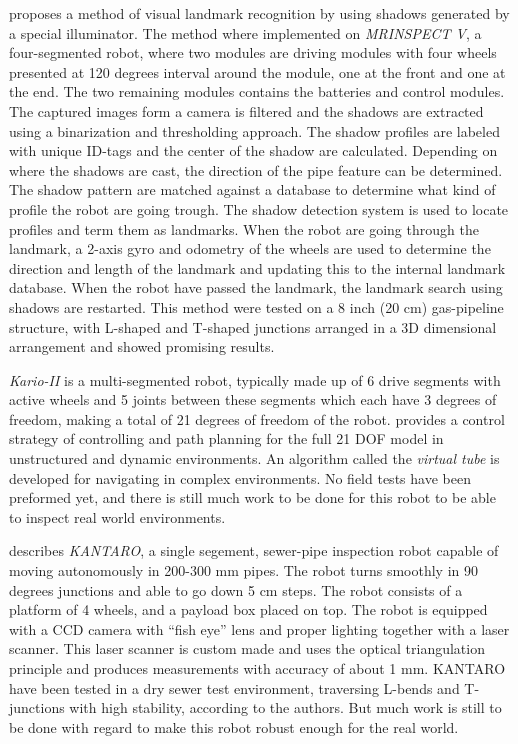 \cite{MRINSPECT-V} proposes a method of visual landmark recognition by using shadows
generated by a special illuminator. The method where implemented on \emph{MRINSPECT V}, a
four-segmented robot, where two modules are driving modules with four wheels presented at
120 degrees interval around the module, one at the front and one at the end. The two
remaining modules contains the batteries and control modules. 
The captured images form a camera is filtered and the
shadows are extracted using a binarization and thresholding approach. The shadow profiles are
labeled with unique ID-tags and the center of the shadow are calculated. Depending on
where the shadows are cast, the direction of the pipe feature can be determined. The
shadow pattern are matched against a database to determine what kind of profile the robot
are going trough. The shadow detection system is used to locate profiles and term them as
landmarks. When the robot are going through the landmark, a 2-axis gyro and odometry of
the wheels are used to determine the direction and length of the landmark and updating
this to the internal landmark database. When the robot have passed the landmark, the 
landmark search using shadows are restarted. This method were tested on a 8 inch (20 cm)
gas-pipeline structure, with L-shaped and T-shaped junctions arranged in a 3D dimensional
arrangement and showed promising results. 


\emph{Kario-II} is a multi-segmented robot, typically made up of 6 drive segments with
active wheels and 5 joints between these segments which each have 3 degrees of freedom,
making a total of 21 degrees of freedom of the robot. \cite{Kairo-II} provides a control
strategy of controlling and path planning for the full 21 DOF model in unstructured and
dynamic environments. An algorithm called the \emph{virtual tube} is developed for
navigating in complex environments. No field tests have been preformed yet, and there is
still much work to be done for this robot to be able to inspect real world environments. 


\cite{KANTARO} describes \emph{KANTARO}, a single segement, sewer-pipe inspection robot 
capable of moving autonomously in 200-300 mm pipes. The robot turns smoothly in 90 degrees 
junctions and able to go down 5 cm steps. The robot consists of a platform of 4 wheels,
and a payload box placed on top. The robot is equipped with a CCD camera with ``fish eye''
lens and proper lighting together with a laser scanner. This laser scanner is custom made
and uses the optical triangulation principle and produces measurements with accuracy
of about 1 mm. KANTARO have been tested in a dry sewer test environment, traversing
L-bends and T-junctions with high stability, according to the authors. But much work is still
to be done with regard to make this robot robust enough for the real world. 


